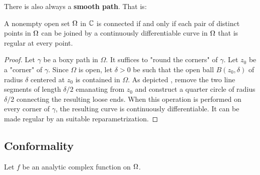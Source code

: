 \documentclass[12pt]{article}
\begin{document}
\rmk There is also always a \textbf{smooth path}. That is: 
\[\]

\begin{theorem}
    A nonempty open set $\Omega$ in $\mathbb{C}$ is connected if and only if each pair of distinct
points in $\Omega$ can be joined by a continuously differentiable curve in $\Omega$ that is regular at
every point.
\end{theorem}
\begin{proof}
    Let $\gamma$ be a boxy path in $\Omega$. It suffices to "round the corners" of $\gamma$. Let $z_{0}$ be a "corner" of $\gamma$. Since $\Omega$ is open, let $\delta>0$ be such that the open ball $B(z_{0},\delta)$ of radius $\delta$ centered at $z_{0}$ is contained in $\Omega$. As depicted , remove the two line segments of length $\delta/2$ emanating from $z_{0}$ and construct a quarter circle of radius $\delta/2$ connecting the resulting loose ends. When this operation is performed on every corner of $\gamma$, the resulting curve is continuously differentiable. It can be made regular by an suitable reparametrization.
\end{proof}

\subsection{Conformality}
Let $f$ be an analytic complex function on $\Omega$.
\end{document}
